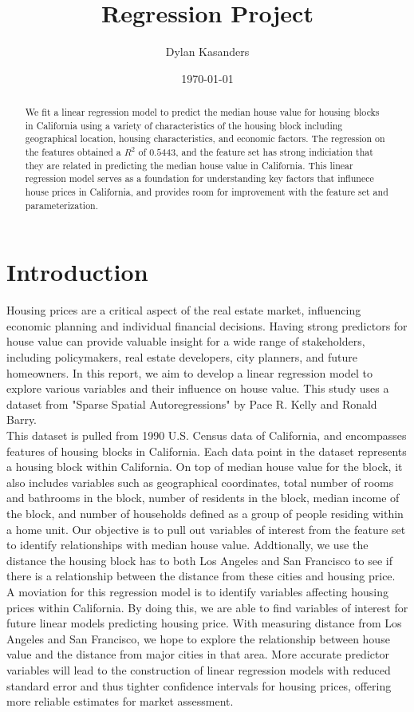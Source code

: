 \documentclass[10pt]{article}
\title{Regression Project}
\author{Dylan Kasanders}
\date{\today}
\begin{document}
\maketitle

\begin{abstract}
We fit a linear regression model to predict the median house value for housing blocks in California using a variety of characteristics of the 
housing block including geographical location, housing characteristics, and economic factors. 
The regression on the features obtained a $R^2$ of $0.5443$, and the feature set has strong indiciation that they are related in 
predicting the median house value in California. This linear regression model serves as a foundation for understanding key factors that 
influnece house prices in California, and provides room for improvement with the feature set and parameterization. 
\end{abstract}

\section{Introduction}
Housing prices are a critical aspect of the real estate market, influencing economic planning and individual financial decisions. Having strong predictors for house value can provide valuable insight for a wide range of stakeholders, including policymakers, real estate developers, city planners, and future homeowners. In this report, we aim to develop a linear regression model to explore various variables and their influence on house value. This study uses a dataset from "Sparse Spatial Autoregressions" by Pace R. Kelly and Ronald Barry.\\ 
\hspace*{2em} This dataset is pulled from 1990 U.S. Census data of California, and encompasses features of housing blocks in California. Each data point in the dataset represents a housing block within California. On top of median house value for the block, it also includes variables such as geographical coordinates, total number of rooms and bathrooms in the block, number of residents in the block, median income of the block, and number of households defined as a group of people residing within a home unit. Our objective is to pull out variables of interest from the feature set to identify relationships with median house value. Addtionally, we use the distance the housing block has to both Los Angeles and San Francisco to see if there is a relationship between the distance from these cities and housing price.\\
\hspace*{2em} A moviation for this regression model is to identify variables affecting housing prices within California. By doing this, we are able to find variables of interest for future linear models predicting housing price. With measuring distance from Los Angeles and San Francisco, we hope to explore the relationship between house value and the distance from major cities in that area. More accurate predictor variables will lead to the construction of linear regression models with reduced standard error and thus tighter confidence intervals for housing prices, offering more reliable estimates for market assessment. 
\end{document}
